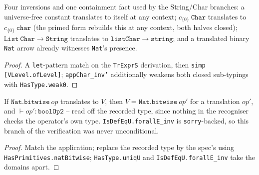 \begin{lemma}
\label{vpc:thm:prim-trexprs-shape-inv}
\leanok
{}

 Four inversions and one containment fact used by the String/Char branches: a
universe-free constant translates to itself at any context; $c_{\{0\}}\ \mathtt{Char}$ translates
to $c_{\{0\}}\ \mathtt{char}$ (the primed form rebuilds this at any context, both halves closed);
$\mathtt{List\ Char} \to \mathtt{String}$ translates to $\mathtt{listChar} \to \mathtt{string}$;
and a translated binary \texttt{Nat} arrow already witnesses \texttt{Nat}'s presence.
\end{lemma}
\begin{proof}\leanok
{} A \texttt{let}-pattern match on the \texttt{TrExprS} derivation, then
\texttt{simp [VLevel.ofLevel]}; \texttt{appChar\_inv'} additionally weakens both closed
sub-typings with \texttt{HasType.weak0}.
\end{proof}

\begin{lemma}
\label{vpc:thm:prim-bitwise-operand}\leanok
{}

 If $\mathtt{Nat.bitwise}\ \mathit{op}$ translates to $V$, then $V =
\mathtt{Nat.bitwise}\ \mathit{op}'$ for a translation $\mathit{op}'$, and $\vdash \mathit{op}' :
\mathtt{boolOp2}$ -- read off the recorded type, since nothing in the recogniser checks the
operator's own type.
 \texttt{IsDefEqU.forallE\_inv} is \texttt{sorry}-backed, so this branch of the
verification was never unconditional.
\end{lemma}
\begin{proof}\leanok
{}
 Match the application; replace the recorded type by the spec's using
\texttt{HasPrimitives.natBitwise}; \texttt{HasType.uniqU} and \texttt{IsDefEqU.forallE\_inv} take
the domains apart.
\end{proof}

